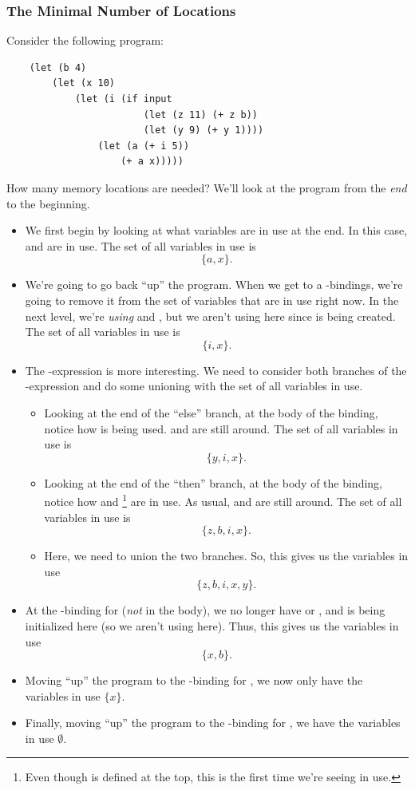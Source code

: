 \documentclass[letterpaper]{article}
\begin{document}
\subsubsection{The Minimal Number of Locations}
Consider the following program: 
\begin{verbatim}
    (let (b 4)
        (let (x 10)
            (let (i (if input 
                        (let (z 11) (+ z b))
                        (let (y 9) (+ y 1))))
                (let (a (+ i 5))
                    (+ a x)))))\end{verbatim}
How many memory locations are needed? We'll look at the program from the \emph{end} to the beginning.
\begin{itemize}
    \item We first begin by looking at what variables are in use at the end. In this case,  and  are in use. The set of all variables in use is \[\{a, x\}.\]
    \item We're going to go back ``up'' the program. When we get to a -bindings, we're going to remove it from the set of variables that are in use right now. In the next level, we're \emph{using}  and , but we aren't using  here since  is being created. The set of all variables in use is \[\{i, x\}.\]
    \item The -expression is more interesting. We need to consider both branches of the -expression and do some unioning with the set of all variables in use. 
    \begin{itemize}
        \item Looking at the end of the ``else'' branch, at the body of the  binding, notice how  is being used.  and  are still around. The set of all variables in use is \[\{y, i, x\}.\]
        \item Looking at the end of the ``then'' branch, at the body of the  binding, notice how  and \footnote{Even though  is defined at the top, this is the first time we're seeing  in use.} are in use. As usual,  and  are still around. The set of all variables in use is \[\{z, b, i, x\}.\]
        \item Here, we need to union the two branches. So, this gives us the variables in use
        \[\{z, b, i, x, y\}.\]
    \end{itemize}
    \item At the -binding for  (\emph{not} in the body), we no longer have  or , and  is being initialized here (so we aren't using  here). Thus, this gives us the variables in use \[\{x, b\}.\] 
    \item Moving ``up'' the program to the -binding for , we now only have the variables in use $\{x\}$. 
    \item Finally, moving ``up'' the program to the -binding for , we have the variables in use $\emptyset$. 
\end{itemize}
\end{document}
